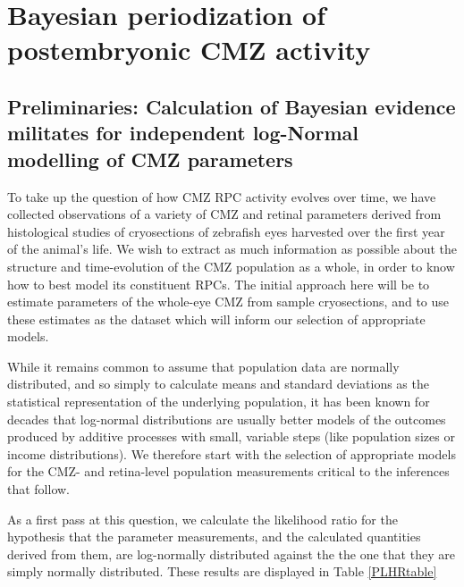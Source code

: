 \chapter{Bayesian periodization of postembryonic CMZ activity}
\label{chap:CMZ}

\section{Preliminaries: Calculation of Bayesian evidence militates for independent log-Normal modelling of CMZ parameters}
To take up the question of how CMZ RPC activity evolves over time, we have collected observations of a variety of CMZ and retinal parameters derived from histological studies of cryosections of zebrafish eyes harvested over the first year of the animal's life. We wish to extract as much information as possible about the structure and time-evolution of the CMZ population as a whole, in order to know how to best model its constituent RPCs. The initial approach here will be to estimate parameters of the whole-eye CMZ from sample cryosections, and to use these estimates as the dataset which will inform our selection of appropriate models.

While it remains common to assume that population data are normally distributed, and so simply to calculate means and standard deviations as the statistical representation of the underlying population, it has been known for decades \cite{Heath1967} that log-normal distributions are usually better models of the outcomes produced by additive processes with small, variable steps (like population sizes or income distributions). We therefore start with the selection of appropriate models for the CMZ- and retina-level population measurements critical to the inferences that follow.

As a first pass at this question, we calculate the likelihood ratio for the hypothesis that the parameter measurements, and the calculated quantities derived from them, are log-normally distributed against the the one that they are simply normally distributed. These results are displayed in Table \ref{PLHRtable}

